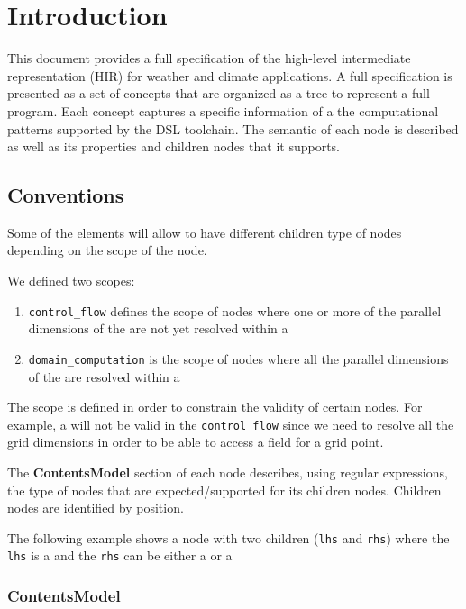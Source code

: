 \section{Introduction}


This document provides a full specification of the high-level intermediate representation (HIR) for weather and climate applications.
A full specification is presented as a set of concepts that
are organized as a tree to represent a full program. 
Each concept captures a specific information of a the computational
patterns supported by the DSL toolchain.
The semantic of each node is described as well as its properties 
and children nodes that it supports. 
 
\subsection{Conventions}

Some of the elements will allow to have different children type of nodes depending on the scope of the node.

We defined two scopes: 
\begin{enumerate}
	\item {\tt control\_flow} defines the scope of nodes where one or more of the parallel dimensions of the  are not yet resolved within a 
	\item {\tt domain\_computation} is the scope of nodes where all the parallel dimensions of the  are resolved within a 
\end{enumerate}

The scope is defined in order to constrain the validity of certain nodes.
For example, a  will not be valid in the 
{\tt control\_flow} since we need to resolve all the grid dimensions
in order to be able to access a field for a grid point.


The {\bf ContentsModel} section of each node describes, using regular expressions, the type of nodes that are expected/supported for its children nodes. 
Children nodes are identified by position. 

The following example shows
a node with two children ({\tt lhs} and {\tt rhs}) where 
the {\tt lhs} is a  and the {\tt rhs} can be either a  or a  

\subsubsection*{ContentsModel}{}

